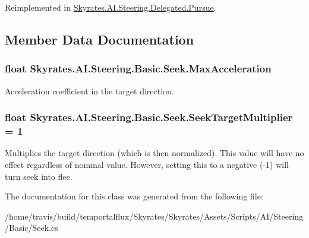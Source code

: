 Reimplemented in \hyperlink{class_skyrates_1_1_a_i_1_1_steering_1_1_delegated_1_1_pursue_a85e6b58d0a48e496dfe3b60c2b4a4a82}{Skyrates.\-A\-I.\-Steering.\-Delegated.\-Pursue}.



\subsection{Member Data Documentation}
\hypertarget{class_skyrates_1_1_a_i_1_1_steering_1_1_basic_1_1_seek_a9d52531865fdebc48a215c22e654c289}{
\subsubsection[{Max\-Acceleration}]{\setlength{\rightskip}{0pt plus 5cm}float Skyrates.\-A\-I.\-Steering.\-Basic.\-Seek.\-Max\-Acceleration}}\label{class_skyrates_1_1_a_i_1_1_steering_1_1_basic_1_1_seek_a9d52531865fdebc48a215c22e654c289}


Acceleration coefficient in the target direction. 

\hypertarget{class_skyrates_1_1_a_i_1_1_steering_1_1_basic_1_1_seek_adc4ddeda4be51c62075cb46acd418ed9}{
\subsubsection[{Seek\-Target\-Multiplier}]{\setlength{\rightskip}{0pt plus 5cm}float Skyrates.\-A\-I.\-Steering.\-Basic.\-Seek.\-Seek\-Target\-Multiplier = 1}}\label{class_skyrates_1_1_a_i_1_1_steering_1_1_basic_1_1_seek_adc4ddeda4be51c62075cb46acd418ed9}


Multiplies the target direction (which is then normalized). This value will have no effect regardless of nominal value. However, setting this to a negative (-\/1) will turn seek into flee. 



The documentation for this class was generated from the following file\-:\begin{DoxyCompactItemize}
\item 
/home/travis/build/temportalflux/\-Skyrates/\-Skyrates/\-Assets/\-Scripts/\-A\-I/\-Steering/\-Basic/Seek.\-cs\end{DoxyCompactItemize}

